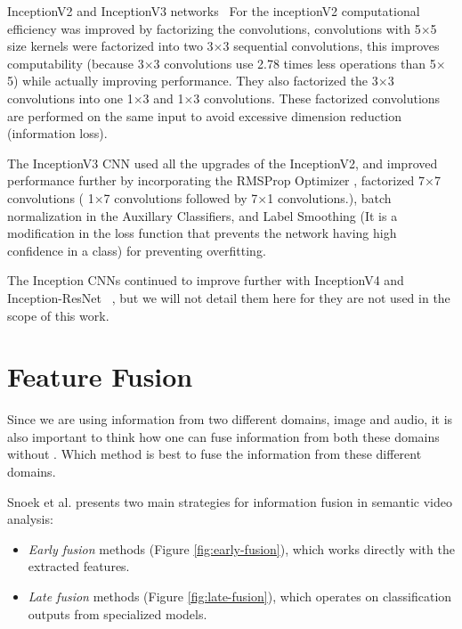 InceptionV2 and InceptionV3 networks~\cite{szegedy2016rethinking}
For the inceptionV2 computational efficiency was improved by factorizing the convolutions, convolutions with 5$\times$5 size kernels were factorized into two 3$\times$3 sequential convolutions, this improves computability (because 3$\times$3 convolutions use 2.78 times less operations than 5$\times$5) while actually improving performance. They also factorized the 3$\times$3 convolutions into one 1$\times$3 and 1$\times$3 convolutions. These factorized convolutions are performed on the same input to avoid excessive dimension reduction (information loss).

The InceptionV3 CNN used all the upgrades of the InceptionV2, and improved performance further by incorporating the RMSProp Optimizer \cite{tieleman2017rmsprop}, factorized 7$\times$7 convolutions ( 1$\times$7 convolutions followed
by 7$\times$1 convolutions.), batch normalization in the Auxillary Classifiers, and Label Smoothing (It is a modification in the loss function that prevents the network having high confidence in a class) for preventing overfitting.



The Inception CNNs continued to improve further with InceptionV4 and Inception-ResNet ~\cite{szegedy2017inceptionv4}, but we will not detail them here for they are not used in the scope of this work.



\section{Feature Fusion}
\label{sec:feature_fusion}

Since we are using information from two different domains, image and audio, it is also important to think how one can fuse information from both these domains without . 
Which method is best to fuse the information from these different domains.

Snoek et al. \cite{snoek2005featurefusion} presents two main strategies for information fusion in semantic video analysis: 
\begin{itemize}
    \item \emph{Early fusion} methods (Figure \ref{fig:early-fusion}), which works directly with the extracted features.
    \item \emph{Late fusion} methods (Figure \ref{fig:late-fusion}), which operates on classification outputs from specialized models.
\end{itemize}

